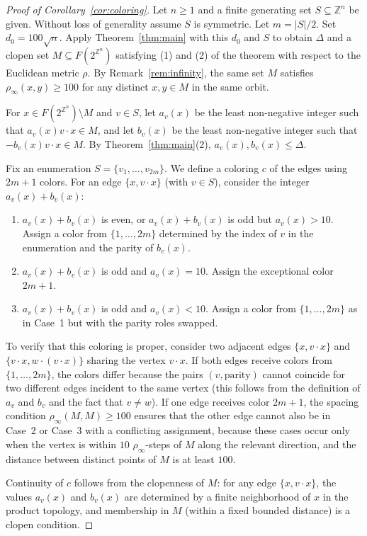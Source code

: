 \documentclass{amsart}
\theoremstyle{definition}
\begin{document}
\begin{proof}[Proof of Corollary~\ref{cor:coloring}]
Let $n\geq 1$ and a finite generating set $S\subseteq\mathbb{Z}^n$ be
given. Without loss of generality assume $S$ is symmetric. Let
$m=|S|/2$. Set
$d_0=100\sqrt{n}$. Apply Theorem~\ref{thm:main} with this $d_0$ and $S$
to obtain $\Delta$ and a clopen set $M\subseteq F(2^{\mathbb{Z}^n})$
satisfying (1) and (2) of the theorem with respect to the Euclidean
metric $\rho$. By Remark~\ref{rem:infinity}, the same set $M$ satisfies
$\rho_\infty(x,y)\geq 100$ for any distinct $x,y\in M$ in the same orbit.

For $x\in F(2^{\mathbb{Z}^n})\setminus M$ and $v\in S$, let $a_v(x)$ be
the least non-negative integer such that $a_v(x)v\cdot x\in M$, and let
$b_v(x)$ be the least non-negative integer such that
$-b_v(x)v\cdot x\in M$.
By Theorem~\ref{thm:main}(2), $a_v(x), b_v(x)\leq\Delta$.

Fix an enumeration $S=\{v_1,\dots,v_{2m}\}$. We define a coloring $c$ of
the edges using $2m+1$ colors. For an edge $\{x, v\cdot x\}$ (with
$v\in S$), consider the integer $a_v(x)+b_v(x)$:

\begin{enumerate}
\item[Case 1.] $a_v(x)+b_v(x)$ is even, or $a_v(x)+b_v(x)$ is odd but
$a_v(x)>10$. Assign a color from $\{1,\dots,2m\}$ determined by the
index of $v$ in the enumeration and the parity of $b_v(x)$.

\item[Case 2.] $a_v(x)+b_v(x)$ is odd and $a_v(x)=10$. Assign the
exceptional color $2m+1$.

\item[Case 3.] $a_v(x)+b_v(x)$ is odd and $a_v(x)<10$. Assign a color
from $\{1,\dots,2m\}$ as in Case~1 but with the parity roles swapped.
\end{enumerate}

To verify that this coloring is proper, consider two adjacent edges
$\{x, v\cdot x\}$ and $\{v\cdot x, w\cdot(v\cdot x)\}$ sharing the
vertex $v\cdot x$. If both edges receive colors from $\{1,\dots,2m\}$,
the colors differ because the pairs $(v, \text{parity})$ cannot coincide
for two different edges incident to the same vertex (this follows from
the definition of $a_v$ and $b_v$ and the fact that $v\neq w$). If one
edge receives color $2m+1$, the spacing condition
$\rho_\infty(M,M)\geq 100$ ensures that the other edge cannot also be
in Case~2 or Case~3 with a conflicting assignment, because these cases
occur only when the vertex is within $10$ $\rho_\infty$-steps of $M$
along the relevant direction, and the distance between distinct points
of $M$ is at least $100$.

Continuity of $c$ follows from the clopenness of $M$: for any edge
$\{x, v\cdot x\}$, the values $a_v(x)$ and $b_v(x)$ are determined by a
finite neighborhood of $x$ in the product topology, and membership in
$M$ (within a fixed bounded distance) is a clopen condition.
\end{proof}
\end{document}
